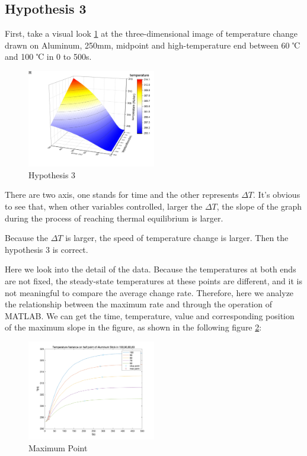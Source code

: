 \documentclass[12pt]{article}
\numberwithin{equation}{section}
\begin{document}
\subsection{Hypothesis 3}
First, take a visual look \ref{3.1} at the three-dimensional image of temperature change drawn on Aluminum, 250mm, midpoint and high-temperature end between 60 ℃ and 100 ℃ in 0 to 500s.


\begin{figure}[H] %
\centering %
\includegraphics[width=0.5\textwidth]{Hypothesis_3_1.png} %
\caption{Hypothesis 3} %
\label{3.1}
\end{figure} 

There are two axis, one stands for time and the other represents $\Delta T$. It’s obvious to see that, when other variables controlled, larger the $\Delta T$, the slope of the graph during the process of reaching thermal equilibrium is larger.

Because the $\Delta T$ is larger, the speed of temperature change is larger. Then the hypothesis 3 is correct.




Here we look into the detail of the data. Because the temperatures at both ends are not fixed, the steady-state temperatures at these points are different, and it is not meaningful to compare the average change rate. Therefore, here we analyze the relationship between the maximum rate and through the operation of MATLAB. We can get the time, temperature, value and corresponding position of the maximum slope in the figure, as shown in the following figure \ref{Max Point}:



\begin{figure}[H] %
\centering %
\includegraphics[width=0.5\textwidth]{Hypothesis3_2.png} %
\caption{Maximum Point} %
\label{Max Point}
\end{figure} 
\end{document}
